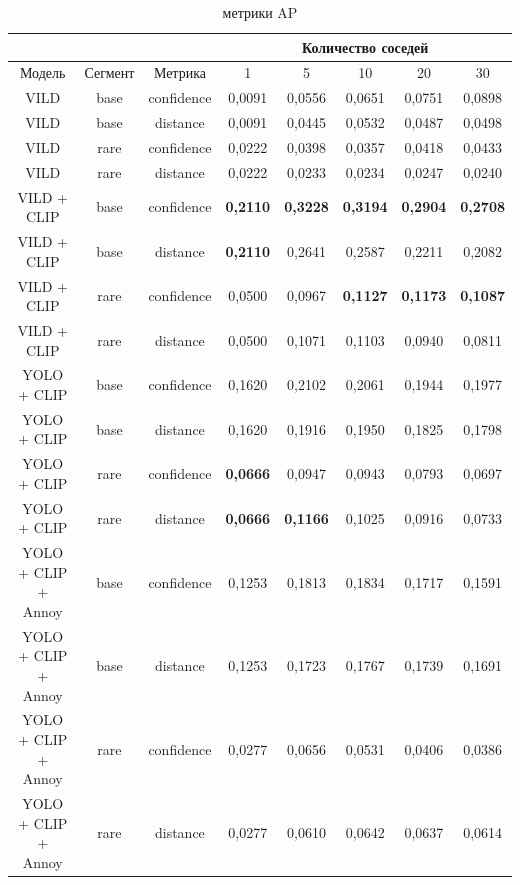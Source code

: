 \documentclass[a4paper,14pt]{article}
\begin{document}
\begin{landscape}
		\begin{table}[H]
            \caption{метрики AP}
			\label{tab:experiments_main} 
			\begin{tabular}{ccc|ccccc|}
				\cline{4-8}
				&  & & \multicolumn{5}{c|}{Количество соседей}                                                                  \\ \hline
				Модель & Сегмент &  Метрика & 1 &  5 &  10 & 20 &  30 \\
				\midrule
				VILD &    base & confidence &     0,0091 &     0,0556 &      0,0651 &      0,0751 &      0,0898 \\
				VILD &    base &   distance &     0,0091 &     0,0445 &      0,0532 &      0,0487 &      0,0498 \\
				VILD &    rare & confidence &     0,0222 &     0,0398 &      0,0357 &      0,0418 &      0,0433 \\
				VILD &    rare &   distance &     0,0222 &     0,0233 &      0,0234 &      0,0247 &      0,0240 \\ \hline
				VILD + CLIP &    base & confidence &     \textbf{0,2110} &     \textbf{0,3228} &      \textbf{0,3194} &      \textbf{0,2904} &      \textbf{0,2708} \\
				VILD + CLIP &    base &   distance &     \textbf{0,2110} &     0,2641 &      0,2587 &      0,2211 &      0,2082 \\
				VILD + CLIP &    rare & confidence &     0,0500 &     0,0967 &      \textbf{0,1127} &      \textbf{0,1173} &      \textbf{0,1087} \\
				VILD + CLIP &    rare &   distance &     0,0500 &     0,1071 &      0,1103 &      0,0940 &      0,0811 \\ \hline
				YOLO + CLIP &    base & confidence &     0,1620 &     0,2102 &      0,2061 &      0,1944 &      0,1977 \\
				YOLO + CLIP &    base &   distance &     0,1620 &     0,1916 &      0,1950 &      0,1825 &      0,1798 \\
				YOLO + CLIP &    rare & confidence &     \textbf{0,0666} &     0,0947 &      0,0943 &      0,0793 &      0,0697 \\
				YOLO + CLIP &    rare &   distance &     \textbf{0,0666} &     \textbf{0,1166} &      0,1025 &      0,0916 &      0,0733 \\ \hline
				YOLO + CLIP + Annoy &    base & confidence &     0,1253 &     0,1813 &      0,1834 &      0,1717 &      0,1591 \\
				YOLO + CLIP + Annoy &    base &   distance &     0,1253 &     0,1723 &      0,1767 &      0,1739 &      0,1691 \\
				YOLO + CLIP + Annoy &    rare & confidence &     0,0277 &     0,0656 &      0,0531 &      0,0406 &      0,0386 \\
				YOLO + CLIP + Annoy &    rare &   distance &     0,0277 &     0,0610 &      0,0642 &      0,0637 &      0,0614 \\
				\bottomrule
			\end{tabular}
		\end{table}
	\end{landscape}
\end{document}
